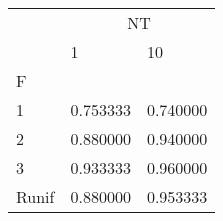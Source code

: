 \begin{table}[htbp]
\centering
\label{iris-results}
\begin{tabular}{lll}
\toprule
 & \multicolumn{2}{c}{NT} \\
 & 1 & 10 \\
F &  &  \\
\midrule
1 & 0.753333 & 0.740000 \\
2 & 0.880000 & 0.940000 \\
3 & 0.933333 & 0.960000 \\
Runif & 0.880000 & 0.953333 \\
\bottomrule
\end{tabular}
\end{table}
